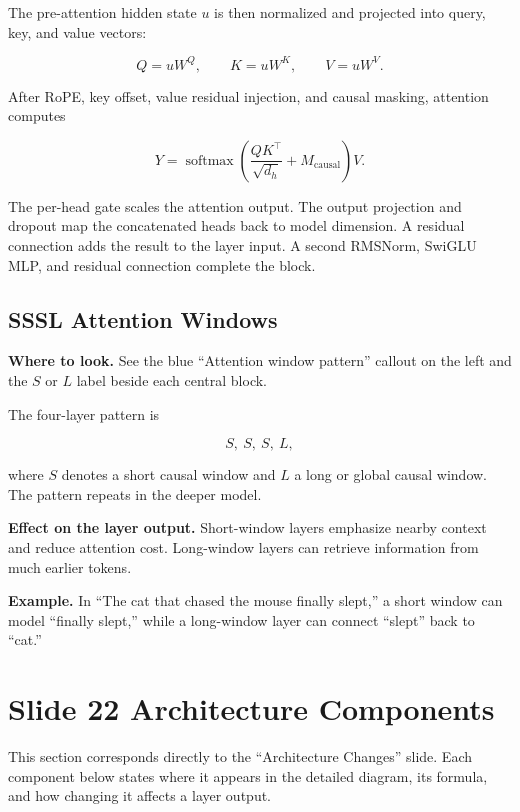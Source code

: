 \documentclass[11pt,a4paper]{article}
\begin{document}
The pre-attention hidden state $u$ is then normalized and projected into query,
key, and value vectors:

\begin{equation}
  Q=uW^Q,\qquad K=uW^K,\qquad V=uW^V.
\end{equation}

After RoPE, key offset, value residual injection, and causal masking, attention
computes

\begin{equation}
  Y=\operatorname{softmax}\left(
    \frac{QK^\top}{\sqrt{d_h}}+M_{\mathrm{causal}}
  \right)V.
\end{equation}

The per-head gate scales the attention output. The output projection and dropout
map the concatenated heads back to model dimension. A residual connection adds
the result to the layer input. A second RMSNorm, SwiGLU MLP, and residual
connection complete the block.

\subsection{SSSL Attention Windows}

\textbf{Where to look.} See the blue ``Attention window pattern'' callout on the
left and the $S$ or $L$ label beside each central block.

The four-layer pattern is

\begin{equation}
  S,\ S,\ S,\ L,
\end{equation}

where $S$ denotes a short causal window and $L$ a long or global causal window.
The pattern repeats in the deeper model.

\textbf{Effect on the layer output.} Short-window layers emphasize nearby
context and reduce attention cost. Long-window layers can retrieve information
from much earlier tokens.

\textbf{Example.} In ``The cat that chased the mouse finally slept,'' a short
window can model ``finally slept,'' while a long-window layer can connect
``slept'' back to ``cat.''

\section{Slide 22 Architecture Components}

This section corresponds directly to the ``Architecture Changes'' slide. Each
component below states where it appears in the detailed diagram, its formula,
and how changing it affects a layer output.
\end{document}
